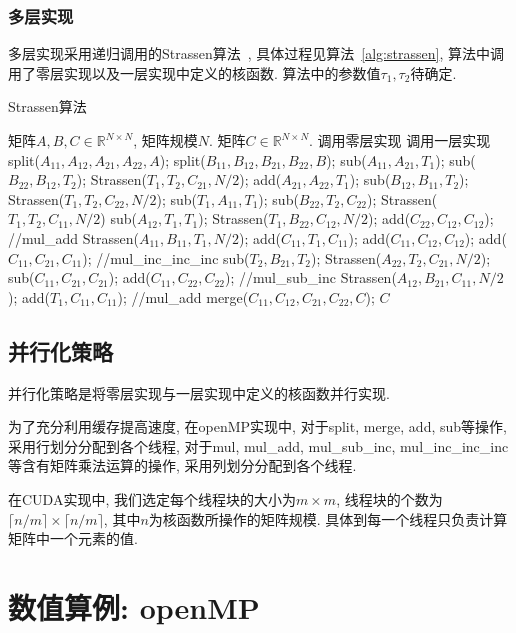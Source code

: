 \documentclass[szjs]{cjcmltx}
\def\R{\mathbb{R}}
\begin{document}
\subsubsection{多层实现}
多层实现采用递归调用的Strassen算法~\cite{Li:2011}, 具体过程见算法~\ref{alg:strassen}, 算法中调用了零层实现以及一层实现中定义的核函数. 算法中的参数值$\tau_1,\tau_2$待确定.
\begin{algorithm}[htbp]\caption{Strassen算法}\label{alg:strassen}\begin{algorithmic}
\Require 矩阵$A,B,C\in\R^{N\times N}$, 矩阵规模$N$.
\Ensure 矩阵$C\in\R^{N\times N}$.
\State 调用零层实现
\State 调用一层实现
\Else
\State split($A_{11},A_{12},A_{21},A_{22},A$); split($B_{11},B_{12},B_{21},B_{22},B$);
\State sub($A_{11},A_{21},T_1$); sub($B_{22},B_{12},T_2$); Strassen($T_1,T_2,C_{21},N/2$); 
\State add($A_{21},A_{22},T_1$); sub($B_{12},B_{11},T_2$); Strassen($T_1,T_2,C_{22},N/2$);
\State sub($T_1,A_{11},T_1$); sub($B_{22},T_2,C_{22}$); Strassen($T_1,T_2,C_{11},N/2$)
\State sub($A_{12},T_1,T_1$);
\State Strassen($T_1,B_{22},C_{12},N/2$); add($C_{22},C_{12},C_{12}$); //mul\_add
\State Strassen($A_{11},B_{11},T_1,N/2$); add($C_{11},T_1,C_{11}$);
\State add($C_{11},C_{12},C_{12}$); add($C_{11},C_{21},C_{11}$); //mul\_inc\_inc\_inc
\State sub($T_2,B_{21},T_2$);
\State Strassen($A_{22},T_2,C_{21},N/2$); sub($C_{11},C_{21},C_{21}$);
\State add($C_{11},C_{22},C_{22}$); //mul\_sub\_inc
\State Strassen($A_{12},B_{21},C_{11},N/2$); add($T_1,C_{11},C_{11}$); //mul\_add
\State merge($C_{11},C_{12},C_{21},C_{22},C$);
\EndIf
\State\Return $C$
\EndFunction
\end{algorithmic}\end{algorithm}

\subsection{并行化策略}
并行化策略是将零层实现与一层实现中定义的核函数并行实现. 

为了充分利用缓存提高速度, 在openMP实现中, 对于split, merge, add, sub等操作, 采用行划分分配到各个线程, 对于mul, mul\_add, mul\_sub\_inc, mul\_inc\_inc\_inc等含有矩阵乘法运算的操作, 采用列划分分配到各个线程.

在CUDA实现中, 我们选定每个线程块的大小为$m\times m$, 线程块的个数为$\lceil n/m\rceil\times\lceil n/m\rceil$, 其中$n$为核函数所操作的矩阵规模. 具体到每一个线程只负责计算矩阵中一个元素的值.

\section{数值算例: openMP}
\end{document}
